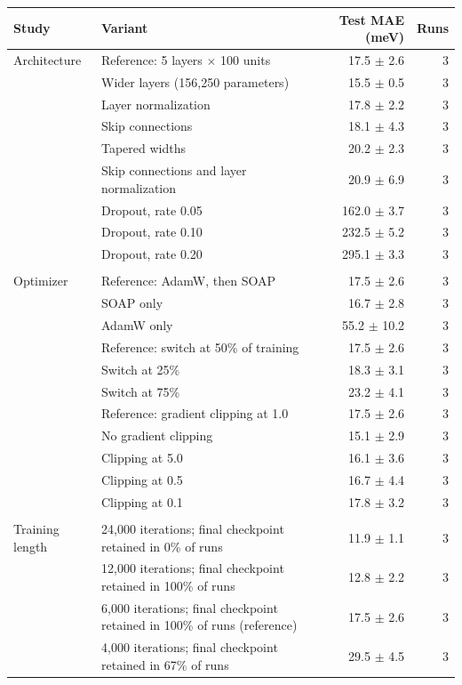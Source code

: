 \begin{tabular}{llrr}
\toprule
\textbf{Study} & \textbf{Variant} & \textbf{Test MAE (meV)} & \textbf{Runs} \\
\midrule
Architecture & Reference: 5 layers $\times$ 100 units & 17.5 $\pm$ 2.6 & 3 \\
 & Wider layers (156{,}250 parameters) & 15.5 $\pm$ 0.5 & 3 \\
 & Layer normalization & 17.8 $\pm$ 2.2 & 3 \\
 & Skip connections & 18.1 $\pm$ 4.3 & 3 \\
 & Tapered widths & 20.2 $\pm$ 2.3 & 3 \\
 & Skip connections and layer normalization & 20.9 $\pm$ 6.9 & 3 \\
 & Dropout, rate 0.05 & 162.0 $\pm$ 3.7 & 3 \\
 & Dropout, rate 0.10 & 232.5 $\pm$ 5.2 & 3 \\
 & Dropout, rate 0.20 & 295.1 $\pm$ 3.3 & 3 \\
\addlinespace \\
Optimizer & Reference: AdamW, then SOAP & 17.5 $\pm$ 2.6 & 3 \\
 & SOAP only & 16.7 $\pm$ 2.8 & 3 \\
 & AdamW only & 55.2 $\pm$ 10.2 & 3 \\
 & Reference: switch at 50\% of training & 17.5 $\pm$ 2.6 & 3 \\
 & Switch at 25\% & 18.3 $\pm$ 3.1 & 3 \\
 & Switch at 75\% & 23.2 $\pm$ 4.1 & 3 \\
 & Reference: gradient clipping at 1.0 & 17.5 $\pm$ 2.6 & 3 \\
 & No gradient clipping & 15.1 $\pm$ 2.9 & 3 \\
 & Clipping at 5.0 & 16.1 $\pm$ 3.6 & 3 \\
 & Clipping at 0.5 & 16.7 $\pm$ 4.4 & 3 \\
 & Clipping at 0.1 & 17.8 $\pm$ 3.2 & 3 \\
\addlinespace \\
Training length & 24{,}000 iterations; final checkpoint retained in 0\% of runs & 11.9 $\pm$ 1.1 & 3 \\
 & 12{,}000 iterations; final checkpoint retained in 100\% of runs & 12.8 $\pm$ 2.2 & 3 \\
 & 6{,}000 iterations; final checkpoint retained in 100\% of runs (reference) & 17.5 $\pm$ 2.6 & 3 \\
 & 4{,}000 iterations; final checkpoint retained in 67\% of runs & 29.5 $\pm$ 4.5 & 3 \\

\end{tabular}
